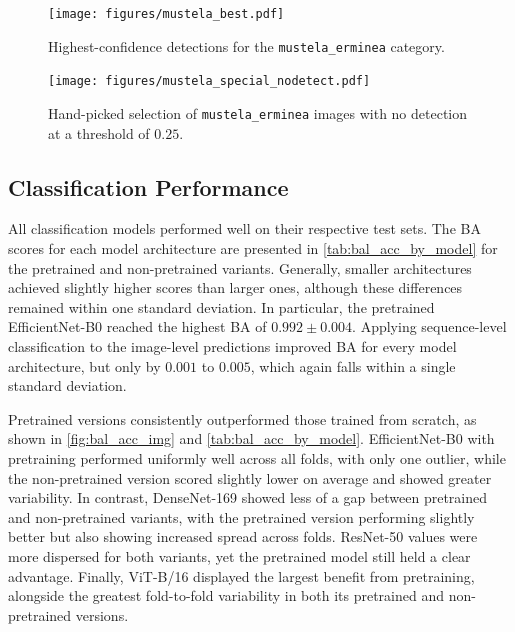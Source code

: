 

\begin{figure}[p]
\centering
\texttt{[image: figures/mustela\_best.pdf]}
\caption{Highest-confidence detections for the \texttt{mustela\_erminea} category.}
\label{fig:detection_mustela_best}
\end{figure}

\begin{figure}[p]
\centering
\texttt{[image: figures/mustela\_special\_nodetect.pdf]}
\caption{Hand-picked selection of \texttt{mustela\_erminea} images with no detection at a threshold of \(0.25\).}
\label{fig:detection_special_nodetect}
\end{figure}

\subsection{Classification Performance}
All classification models performed well on their respective test sets.
The \ac{BA} scores for each model architecture are presented in \autoref{tab:bal_acc_by_model} for the pretrained and non-pretrained variants.
Generally, smaller architectures achieved slightly higher scores than larger ones, although these differences remained within one standard deviation.
In particular, the pretrained EfficientNet-B0 reached the highest \ac{BA} of \(0.992\pm0.004\).
Applying sequence-level classification to the image-level predictions improved \ac{BA} for every model architecture, but only by \(0.001\) to \(0.005\), which again falls within a single standard deviation.

Pretrained versions consistently outperformed those trained from scratch, as shown in \autoref{fig:bal_acc_img} and \autoref{tab:bal_acc_by_model}.
EfficientNet-B0 with pretraining performed uniformly well across all folds, with only one outlier, while the non-pretrained version scored slightly lower on average and showed greater variability.
In contrast, DenseNet-169 showed less of a gap between pretrained and non-pretrained variants, with the pretrained version performing slightly better but also showing increased spread across folds.
ResNet-50 values were more dispersed for both variants, yet the pretrained model still held a clear advantage.
Finally, ViT-B/16 displayed the largest benefit from pretraining, alongside the greatest fold-to-fold variability in both its pretrained and non-pretrained versions.

\setlength{\fboxsep}{1pt}

\setlength{\fboxsep}{3pt}

